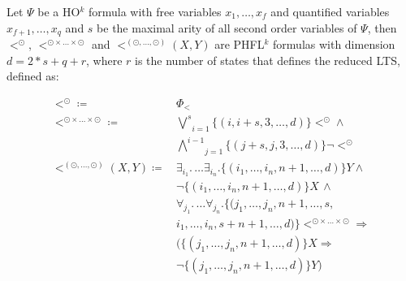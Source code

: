 \begin{definition}
    \label{definition:lower_bound_less_second}
    Let $\Psi$ be a HO$^k$ formula with free variables $x_1, \dots, x_f$ and quantified variables $x_{f+1}, \dots,
    x_q$ and $s$ be the maximal arity of all second order variables of $\Psi$, then $<^\odot$, $<^{\odot \times \dots
    \times \odot}$ and $<^{(\odot, \dots, \odot)}(X, Y)$ are PHFL$^k$ formulas with dimension $d = 2 * s + q + r$, where $r$ is the number of states that defines the reduced LTS, defined as:

    \begin{align*}
        <^\odot \coloneqq &\,\Phi_< \\
        <^{\odot \times \dots \times \odot} \coloneqq
            &\,\underset{i = 1}{\overset{s}{\bigvee}}\{(i, i + s, 3, \dots, d)\} <^\odot \wedge \\
            &\,\underset{j = 1}{\overset{i - 1}{\bigwedge}}\{(j + s, j, 3, \dots, d)\} \neg <^\odot \\
        <^{(\odot, \dots, \odot)}(X, Y) \coloneqq
            &\,\exists_{i_1}.\, \dots \exists_{i_n}. \{(i_1, \dots, i_n, n + 1,\dots, d)\}Y \wedge \\
            &\,\neg \{(i_1, \dots, i_n, n + 1, \dots, d)\} X\,\wedge \\
            &\, \forall_{j_1}. \,\dots \forall_{j_n}. \{(j_1, \dots, j_n, n+1, \dots, s, \\
            &\,i_1, \dots, i_n, s + n + 1, \dots,  d)\}<^{\odot \times \dots \times \odot} \Rightarrow \\
            &\,(\{(j_1,\dots, j_n, n + 1, \dots, d)\} X \Rightarrow \\
            &\,\neg \{(j_1, \dots, j_n, n + 1, \dots, d)\} Y)
    \end{align*}
\end{definition}

